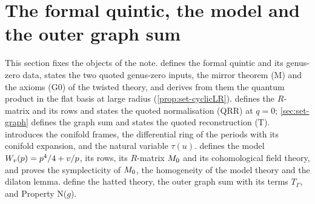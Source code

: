\section{The formal quintic, the model and the outer graph sum}
\label{sec:set}

This section fixes the objects of the note.  defines the formal quintic and its genus-zero data, states the two quoted genus-zero inputs, the mirror theorem (M) and the axioms (G0) of the twisted theory, and derives from them the quantum product in the flat basis at large radius (\cref{prop:set-cyclicLR}).  defines the $R$-matrix and its rows and states the quoted normalisation (QRR) at $q=0$; \cref{sec:set-graph} defines the graph sum and states the quoted reconstruction (T).  introduces the conifold frames, the differential ring of the periods with its conifold expansion, and the natural variable $\tau(u)$.  defines the model $W_{v}(p)=p^4/4+v/p$, its rows, its $R$-matrix $M_{0}$ and its cohomological field theory, and proves the symplecticity of $M_{0}$, the homogeneity of the model theory and the dilaton lemma.  define the hatted theory, the outer graph sum with its terms $T_\Gamma$, and Property N($g$).

